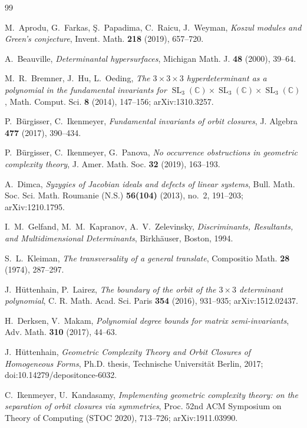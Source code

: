 \documentclass[11pt,reqno]{amsart}
\theoremstyle{plain}
\theoremstyle{definition}
\DeclareMathOperator{\SL}{SL}
\newcommand{\bC}{\mathbb{C}}
\begin{document}
\begin{thebibliography}{99}

M.~Aprodu, G.~Farkas, {\c S}.~Papadima, C.~Raicu, J.~Weyman,
\emph{Koszul modules and Green's conjecture},
Invent. Math. \textbf{218} (2019), 657--720.

A.~Beauville,
\emph{Determinantal hypersurfaces},
Michigan Math. J. \textbf{48} (2000), 39--64.

M.~R.~Bremner, J.~Hu, L.~Oeding,
\emph{The $3\times3\times3$ hyperdeterminant as a polynomial in the fundamental
invariants for $\SL_3(\bC)\times\SL_3(\bC)\times\SL_3(\bC)$},
Math. Comput. Sci. \textbf{8} (2014), 147--156; arXiv:1310.3257.

P.~B\"urgisser, C.~Ikenmeyer,
\emph{Fundamental invariants of orbit closures},
J. Algebra \textbf{477} (2017), 390--434.

P.~B\"urgisser, C.~Ikenmeyer, G.~Panova,
\emph{No occurrence obstructions in geometric complexity theory},
J. Amer. Math. Soc. \textbf{32} (2019), 163--193.

A.~Dimca,
\emph{Syzygies of Jacobian ideals and defects of linear systems},
Bull. Math. Soc. Sci. Math. Roumanie (N.S.) \textbf{56(104)} (2013), no.~2,
191--203; arXiv:1210.1795.

I.~M.~Gelfand, M.~M.~Kapranov, A.~V.~Zelevinsky,
\emph{Discriminants, Resultants, and Multidimensional Determinants},
Birkh\"auser, Boston, 1994.

S.~L.~Kleiman,
\emph{The transversality of a general translate},
Compositio Math. \textbf{28} (1974), 287--297.

J.~H\"uttenhain, P.~Lairez,
\emph{The boundary of the orbit of the $3\times3$ determinant polynomial},
C. R. Math. Acad. Sci. Paris \textbf{354} (2016), 931--935; arXiv:1512.02437.

H.~Derksen, V.~Makam,
\emph{Polynomial degree bounds for matrix semi-invariants},
Adv. Math. \textbf{310} (2017), 44--63.

J.~H\"uttenhain,
\emph{Geometric Complexity Theory and Orbit Closures of Homogeneous Forms},
Ph.D. thesis, Technische Universit\"at Berlin, 2017;
doi:10.14279/depositonce-6032.

C.~Ikenmeyer, U.~Kandasamy,
\emph{Implementing geometric complexity theory: on the separation of orbit
closures via symmetries},
Proc. 52nd ACM Symposium on Theory of Computing (STOC 2020), 713--726;
arXiv:1911.03990.


\end{thebibliography}
\end{document}

